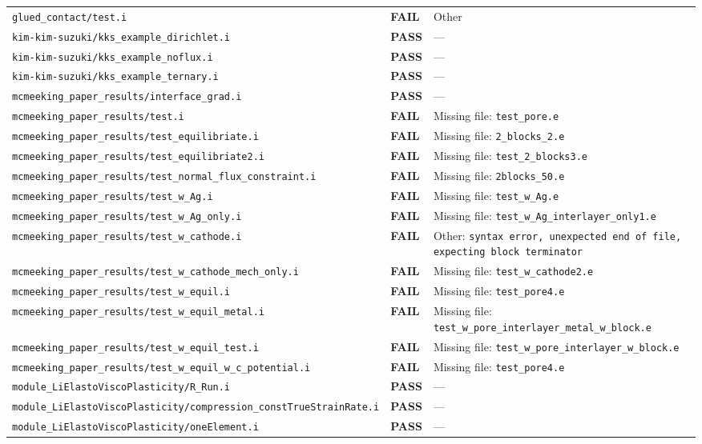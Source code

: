 \documentclass[10pt,letterpaper]{article}
\newcommand{\PASS}{\textcolor{passgreen}{\textbf{PASS}}}
\newcommand{\FAIL}{\textcolor{failred}{\textbf{FAIL}}}
\newcommand{\code}[1]{\texttt{\small #1}}
\begin{document}
\begin{longtable}{p{} l p{}}
\code{glued\_contact/test.i} & \FAIL & Other \\
\code{kim-kim-suzuki/kks\_example\_dirichlet.i} & \PASS & --- \\
\code{kim-kim-suzuki/kks\_example\_noflux.i} & \PASS & --- \\
\code{kim-kim-suzuki/kks\_example\_ternary.i} & \PASS & --- \\
\code{mcmeeking\_paper\_results/interface\_grad.i} & \PASS & --- \\
\code{mcmeeking\_paper\_results/test.i} & \FAIL & Missing file: \code{test\_pore.e} \\
\code{mcmeeking\_paper\_results/test\_equilibriate.i} & \FAIL & Missing file: \code{2\_blocks\_2.e} \\
\code{mcmeeking\_paper\_results/test\_equilibriate2.i} & \FAIL & Missing file: \code{test\_2\_blocks3.e} \\
\code{mcmeeking\_paper\_results/test\_normal\_flux\_constraint.i} & \FAIL & Missing file: \code{2blocks\_50.e} \\
\code{mcmeeking\_paper\_results/test\_w\_Ag.i} & \FAIL & Missing file: \code{test\_w\_Ag.e} \\
\code{mcmeeking\_paper\_results/test\_w\_Ag\_only.i} & \FAIL & Missing file: \code{test\_w\_Ag\_interlayer\_only1.e} \\
\code{mcmeeking\_paper\_results/test\_w\_cathode.i} & \FAIL & Other: \code{syntax error, unexpected end of file, expecting block terminator} \\
\code{mcmeeking\_paper\_results/test\_w\_cathode\_mech\_only.i} & \FAIL & Missing file: \code{test\_w\_cathode2.e} \\
\code{mcmeeking\_paper\_results/test\_w\_equil.i} & \FAIL & Missing file: \code{test\_pore4.e} \\
\code{mcmeeking\_paper\_results/test\_w\_equil\_metal.i} & \FAIL & Missing file: \code{test\_w\_pore\_interlayer\_metal\_w\_block.e} \\
\code{mcmeeking\_paper\_results/test\_w\_equil\_test.i} & \FAIL & Missing file: \code{test\_w\_pore\_interlayer\_w\_block.e} \\
\code{mcmeeking\_paper\_results/test\_w\_equil\_w\_c\_potential.i} & \FAIL & Missing file: \code{test\_pore4.e} \\
\code{module\_LiElastoViscoPlasticity/R\_Run.i} & \PASS & --- \\
\code{module\_LiElastoViscoPlasticity/compression\_constTrueStrainRate.i} & \PASS & --- \\
\code{module\_LiElastoViscoPlasticity/oneElement.i} & \PASS & --- \\

\end{longtable}
\end{document}
